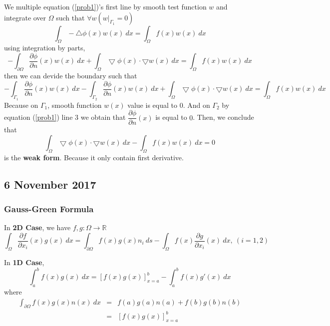 \documentclass[a4paper,10pt]{article}
\begin{document}
We multiple equation (\ref{prob1})'s first line by smooth test function $ w $ and integrate over $ \Omega $ such that  $ \forall w (w|_{\Gamma_{1}}=0 ) $
\begin{equation*}\nonumber
\int_{\Omega} -\bigtriangleup \phi(x) w(x) \ dx = \int_{\Omega} f(x) w(x) \ dx
\end{equation*}
using integration by parts,
\begin{equation*}
-\int_{\partial\Omega} \dfrac{\partial \phi}{\partial n} (x) w(x) \ dx + \int_{\Omega} \bigtriangledown \phi(x) \cdot \bigtriangledown w(x) \ dx = \int_{\Omega} f(x) w(x) \ dx
 \end{equation*} 
 then we can devide the boundary such that
 \begin{equation*}
 -\int_{\Gamma_{1}} \dfrac{\partial \phi}{\partial n} (x) w(x) \ dx - \int_{\Gamma_{2}} \dfrac{\partial \phi}{\partial n} (x) w(x) \ dx + \int_{\Omega} \bigtriangledown \phi(x) \cdot \bigtriangledown w(x) \ dx = \int_{\Omega} f(x) w(x) \ dx
 \end{equation*} 
 Because on $ \Gamma_{1} $, smooth function $ w(x) $ value is equal to $ 0 $. And on $ \Gamma_{2} $ by equation (\ref{prob1}) line 3 we obtain that $ \dfrac{\partial \phi}{\partial n} (x) $ is equal to $ 0 $. Then, we conclude that
 \begin{equation}\label{prob1_weak}
 \int_{\Omega} \bigtriangledown \phi (x) \cdot \bigtriangledown w(x) \ dx - \int_{\Omega} f(x) w(x) \ dx =0
 \end{equation}
 is the \textbf{weak form}. Because it only contain first derivative.

\subsection{6 November 2017}

\subsubsection{Gauss-Green Formula}
In \textbf{2D Case}, we have $ f,g : \Omega \rightarrow \mathbb{R} $
\begin{equation}\label{GG2D}
\int_{\Omega} \dfrac{\partial f}{\partial x_{i}} (x) g(x) \ dx = \int_{\partial \Omega} f(x) g(x) n_{i} \ ds - \int_{\Omega} f(x) \dfrac{\partial g}{\partial x_{i}} (x) \ dx, \ (i=1,2)
\end{equation}

In \textbf{1D Case},
\begin{equation}\label{GG1D}
\int_{a}^{b} f(x) g(x) \ dx = [ f(x) g(x) ]_{x=a}^{b} - \int_{a}^{b} f(x) g'(x) \ dx
\end{equation}
where
\begin{eqnarray}\nonumber
\int_{\partial \Omega} f(x) g(x) n(x) \ dx & = & f(a)g(a)n(a) + f(b)g(b)n(b) \\ \nonumber
& = & [f(x)g(x)]_{x=a}^{b}
\end{eqnarray}
\end{document}
